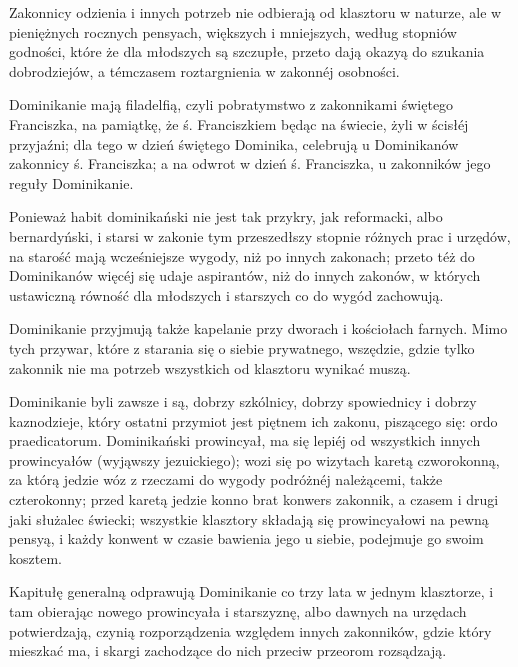 \documentclass{book}
\begin{document}
Zakonnicy odzienia i innych potrzeb nie odbierają od klasztoru w naturze, ale w pieniężnych rocznych pensyach, większych i mniejszych, według stopniów godności, które że dla młodszych są szczupłe, przeto dają okazyą do szukania dobrodziejów, a témczasem roztargnienia w zakonnéj osobności.

Dominikanie mają filadelfią, czyli pobratymstwo z zakonnikami świętego Franciszka, na pamiątkę, że ś. Franciszkiem będąc na świecie, żyli w ścisłéj przyjaźni; dla tego w dzień świętego Dominika, celebrują u Dominikanów zakonnicy ś. Franciszka; a na odwrot w dzień ś. Franciszka, u zakonników jego reguły Dominikanie.

Ponieważ habit dominikański nie jest tak przykry, jak reformacki, albo bernardyński, i starsi w zakonie tym przeszedłszy stopnie różnych prac i urzędów, na starość mają wcześniejsze wygody, niż po innych zakonach; przeto téż do Dominikanów więcéj się udaje aspirantów, niż do innych zakonów, w których ustawiczną równość dla młodszych i starszych co do wygód zachowują.

Dominikanie przyjmują także kapelanie przy dworach i kościołach farnych. Mimo tych przywar, które z starania się o siebie prywatnego, wszędzie, gdzie tylko zakonnik nie ma potrzeb wszystkich od klasztoru wynikać muszą.

Dominikanie byli zawsze i są, dobrzy szkólnicy, dobrzy spowiednicy i dobrzy kaznodzieje, który ostatni przymiot jest piętnem ich zakonu, piszącego się: ordo praedicatorum. Dominikański prowincyał, ma się lepiéj od wszystkich innych prowincyałów (wyjąwszy jezuickiego); wozi się po wizytach karetą czworokonną, za którą jedzie wóz z rzeczami do wygody podróżnéj należącemi, także czterokonny; przed karetą jedzie konno brat konwers zakonnik, a czasem i drugi jaki służalec świecki; wszystkie klasztory składają się prowincyałowi na pewną pensyą, i każdy konwent w czasie bawienia jego u siebie, podejmuje go swoim kosztem.

Kapitułę generalną odprawują Dominikanie co trzy lata w jednym klasztorze, i tam obierając nowego prowincyała i starszyznę, albo dawnych na urzędach potwierdzają, czynią rozporządzenia względem innych zakonników, gdzie który mieszkać ma, i skargi zachodzące do nich przeciw przeorom rozsądzają.
\end{document}
